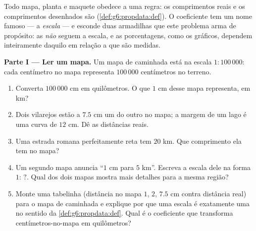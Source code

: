 \begin{problem}
\label{pb:g6:propdata:1}
Todo mapa, planta e maquete obedece a uma regra: os comprimentos reais
e os comprimentos desenhados são \emph{}
(\cref{def:g6:propdata:def}). O coeficiente tem um nome famoso --- a
\emph{escala} --- e esconde duas armadilhas que este
problema arma de propósito: as  \emph{não} seguem a escala, e as
porcentagens, como os gráficos, dependem inteiramente daquilo em
relação a que são medidas.

\medskip
\noindent\textbf{Parte I --- Ler um mapa.}
Um mapa de caminhada está na escala $1:100\,000$: cada centímetro no
mapa representa $100\,000$ centímetros no terreno.
\begin{enumerate}
  \item Converta $100\,000$ cm em quilômetros. O que $1$ cm desse mapa
        representa, em km?
  \item Dois vilarejos estão a $7.5$ cm um do outro no mapa; a margem
        de um lago é uma curva de $12$ cm. Dê as distâncias reais.
  \item Uma estrada romana perfeitamente reta tem $20$ km. Que
        comprimento ela tem no mapa?
  \item Um segundo mapa anuncia ``$1$ cm para $5$ km''. Escreva a
        escala dele na forma $1: \,?$. Qual dos dois mapas mostra mais
        detalhes para a mesma região?
  \item Monte uma tabelinha (distância no mapa $1$, $2$, $7.5$ cm
        contra distância real) para o mapa de caminhada e explique por
        que uma escala é exatamente uma  no sentido da
        \cref{def:g6:propdata:def}. Qual é o coeficiente que transforma
        centímetros-no-mapa em quilômetros?
\end{enumerate}


\end{problem}
